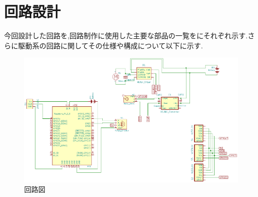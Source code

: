 
\section{回路設計}
今回設計した回路を,回路制作に使用した主要な部品の一覧をにそれぞれ示す.さらに駆動系の回路に関してその仕様や構成について以下に示す.


\begin{figure}[h]
\centering
\includegraphics[scale=0.6]{picture/eps/ele_circuit_fig1.eps}
\caption{回路図}
\label{fig::overall_electric_circuit}
\end{figure}

\clearpage


